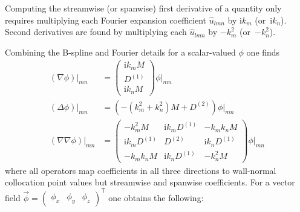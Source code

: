 \documentclass[letterpaper,11pt,nointlimits,reqno,draft]{amsbook}
\newcommand{\ii}{\ensuremath{\mathrm{i}}}
\newcommand{\trans}[1]{{#1}^{\ensuremath{\mathsf{T}}}}
\begin{document}
Computing the streamwise (or spanwise) first derivative of a quantity only
requires multiplying each Fourier expansion coefficient $\hat{u}_{l m n}$ by
$\ii k_{m}$ (or~$\ii k_{n}$).  Second derivatives are found by multiplying each
$\hat{u}_{l m n}$ by $-k_{m}^2$ (or~$-k_{n}^2$).

Combining the B-spline and Fourier details for a scalar-valued $\phi$ one finds
\begin{align}
  \left.\left(\nabla{} \phi\right)\right|_{m n}
&=
  \begin{pmatrix}
    \ii k_m M \\
    D^{(1)}   \\
    \ii k_n M
  \end{pmatrix} \phi\bigr|_{m n}
\\
   \left.\left(\Delta{} \phi\right)\right|_{m n}
&= \left( -\left(k_m^2 + k_n^2\right)M + D^{(2)} \right) \phi\bigr|_{m n}
\\
  \left.\left(\nabla\nabla{} \phi\right)\right|_{m n}
&=
  \begin{pmatrix}
    -k_m^2      M       & \ii k_m D^{(1)} & -k_{m}k_{n} M   \\
    \ii k_m     D^{(1)} &         D^{(2)} & \ii k_n D^{(1)} \\
    -k_{m}k_{n} M       & \ii k_n D^{(1)} & -k_n^2 M
  \end{pmatrix} \phi\bigr|_{m n}
\end{align}
where all operators map coefficients in all three directions to wall-normal
collocation point values but streamwise and spanwise coefficients.  For a
vector field $\vec{\phi}=\trans{\begin{pmatrix}\phi_{x} & \phi_{y} &
 \phi_{z}\end{pmatrix}}$ one obtains the following:
\end{document}
